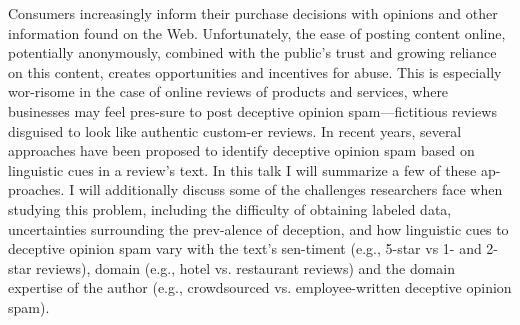 Consumers increasingly inform their purchase decisions with opinions and other information found on the Web. Unfortunately, the ease of posting content online, potentially anonymously, combined with the public's trust and growing reliance on this content, creates opportunities and incentives for abuse. This is especially wor-risome in the case of online reviews of products and services, where businesses may feel pres-sure to post deceptive opinion spam---fictitious reviews disguised to look like authentic custom-er reviews. In recent years, several approaches have been proposed to identify deceptive opinion spam based on linguistic cues in a review's text. In this talk I will summarize a few of these ap-proaches. I will additionally discuss some of the challenges researchers face when studying this problem, including the difficulty of obtaining labeled data, uncertainties surrounding the prev-alence of deception, and how linguistic cues to deceptive opinion spam vary with the text's sen-timent (e.g., 5-star vs 1- and 2-star reviews), domain (e.g., hotel vs. restaurant reviews) and the domain expertise of the author (e.g., crowdsourced vs. employee-written deceptive opinion spam).
